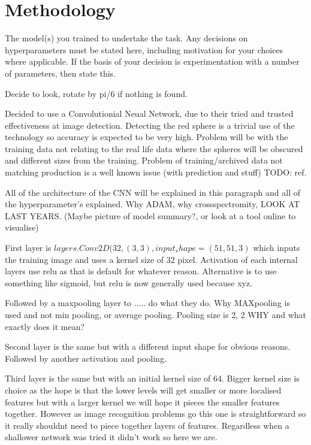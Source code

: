 \documentclass{article}
\begin{document}
\section{Methodology}
The model(s) you trained to undertake the task. Any decisions
on hyperparameters must be stated here, including motivation for your
choices where applicable. If the basis of your decision is experimentation
with a number of parameters, then state this.


Decide to look, rotate by pi/6 if nothing is found.

Decided to use a Convolutionial Neual Network, due to their tried and trusted effectiveness at image detection.
Detecting the red sphere is a trivial use of the technology so accuracy is expected to be very high.
Problem will be with the training data not relating to the real life data where the spheres will be obscured and different sizes from the training.
Problem of training/archived data not matching production is a well known issue (with prediction and stuff) TODO: ref.

All of the architecture of the CNN will be explained in this paragraph and all of the hyperparameter's explained.
Why ADAM, why crossspectromity, LOOK AT LAST YEARS.
(Maybe picture of model summary?, or look at a tool online to visualise)

First layer is 
$layers.Conv2D(32, (3, 3), input_shape=(51, 51, 3)$
which inputs the training image and uses a kernel size of 32 pixel.
Activation of each internal layers use relu as that is default for whatever reason.
Alternative is to use something like sigmoid, but relu is now generally used because xyz. 

Followed by a maxpooling layer to ..... do what they do.
Why MAXpooling is used and not min pooling, or average pooling.
Pooling size is 2, 2 WHY and what exactly does it mean?

Second layer is the same but with a different input shape for obvious reasons.
Followed by another activation and pooling.

Third layer is the same but with an initial kernel size of 64.
Bigger kernel size is choice as the hope is that the lower levels will get smaller or more localised features but with a larger kernel we will hope it pieces the smaller features together.
However as image recognition problems go this one is straightforward so it really shouldnt need to piece together layers of features.
Regardless when a shallower network was tried it didn't work so here we are.  
\end{document}
